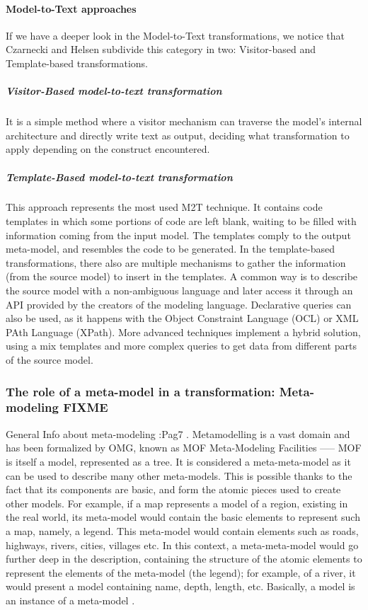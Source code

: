 \paragraph{Model-to-Text approaches}
If we have a deeper look in the Model-to-Text transformations, we notice that Czarnecki and Helsen \cite{Czarnecki03classificationof} subdivide this category in two: Visitor-based and Template-based transformations.
\subparagraph{Visitor-Based model-to-text transformation}
It is a simple method where a visitor mechanism can traverse the model's internal architecture and directly write text as output, deciding what transformation to apply depending on the construct encountered. 
\subparagraph{Template-Based model-to-text transformation}
This approach represents the most used M2T technique. It contains code templates in which some portions of code are left blank, waiting to be filled with information coming from the input model. 
The templates comply to the output meta-model, and resembles the code to be generated. 
In the template-based transformations, there also are multiple mechanisms to gather the information (from the source model) to insert in the templates. A common way is to describe the source model with a non-ambiguous language and later access it through an API provided by the creators of the modeling language. Declarative queries can also be used, as it happens with the Object Constraint Language (OCL) or XML PAth Language (XPath). 
More advanced techniques implement a hybrid solution, using a mix templates and more complex queries to get data from different parts of the source model.  

\subsubsection{The role of a meta-model in a transformation: Meta-modeling FIXME}

General Info about meta-modeling   :Pag7 \cite{AcceleoUserGuide}.
Metamodelling is a vast domain and has been formalized by OMG, known as MOF Meta-Modeling Facilities
----- MOF is itself a model, represented as a tree. It is considered a meta-meta-model as it can be used to describe many other meta-models. This is possible thanks to the fact that its components are basic, and form the atomic pieces used to create other models. 
For example, if a map represents a model of a region, existing in the real world, its meta-model would contain the basic elements to represent such a map, namely, a legend. This meta-model would contain elements such as roads, highways, rivers, cities, villages etc. In this context, a meta-meta-model would go further deep in the description, containing the structure of the atomic elements to represent the elements of the meta-model (the legend); for example, of a river, it would present a model containing name, depth, length, etc.  
Basically, a model is an instance of a meta-model \cite{UnderstandMetamodelling}. 

